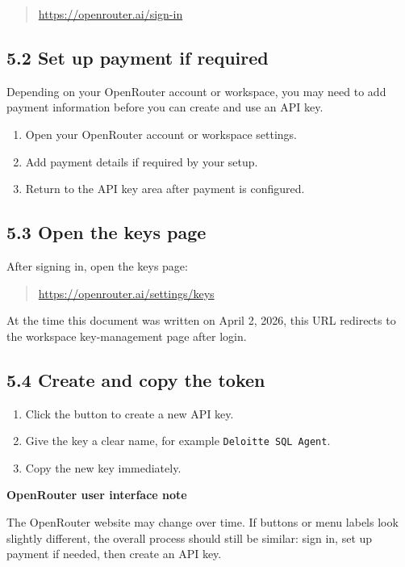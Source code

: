 \documentclass[11pt,a4paper]{article}
\begin{document}
\begin{quote}
\url{https://openrouter.ai/sign-in}
\end{quote}

\subsection*{5.2 Set up payment if required}

Depending on your OpenRouter account or workspace, you may need to add payment information before you can create and use an API key.

\begin{enumerate}[leftmargin=1.5em]
    \item Open your OpenRouter account or workspace settings.
    \item Add payment details if required by your setup.
    \item Return to the API key area after payment is configured.
\end{enumerate}

\subsection*{5.3 Open the keys page}

After signing in, open the keys page:

\begin{quote}
\url{https://openrouter.ai/settings/keys}
\end{quote}

At the time this document was written on April 2, 2026, this URL redirects to the workspace key-management page after login.

\subsection*{5.4 Create and copy the token}

\begin{enumerate}[leftmargin=1.5em]
    \item Click the button to create a new API key.
    \item Give the key a clear name, for example \texttt{Deloitte SQL Agent}.
    \item Copy the new key immediately.
\end{enumerate}

\begin{infobox}
\textbf{OpenRouter user interface note}

The OpenRouter website may change over time. If buttons or menu labels look slightly different, the overall process should still be similar: sign in, set up payment if needed, then create an API key.
\end{infobox}
\end{document}
